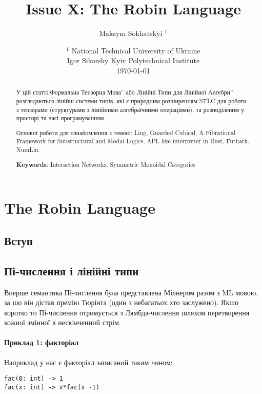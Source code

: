 \documentclass{article}
\begin{document}
\title{Issue X: The Robin Language}
\author{Maksym Sokhatskyi $^1$}
\date{ $^1$ National Technical University of Ukraine \\
       \small Igor Sikorsky Kyiv Polytechnical Institute \\
       \today }

\maketitle

\begin{abstract}

У цій статті Формальна Тензорна Мова'' або Лінійні Типи для Лінійної Алгебри''
розглядаються лінійні системи типів,
які є природним розширенням STLC для роботи з тензорами (структурами з лінійними алгебраїчними операціями),
та розподіленим у просторі та часі програмуванням.

Основні роботи для ознайомлення з темою: Ling, Guarded Cubical,
A Fibrational Framework for Substructural and Modal Logics,
APL-like interpreter in Rust, Futhark, NumLin.

{\bf Keywords}: Interaction Networks, Symmetric Monoidal Categories
\end{abstract}

\ifincludeTOC
  \tableofcontents
\fi

\newpage

\section{The Robin Language}

\subsection{Вступ}

\subsection{Пі-числення і лінійні типи}
Вперше семантика Пі-числення була представлена Мілнером разом з ML мовою,
за шо він дістав премію Тюрінга (один з небагатьох хто заслужено).
Якшо коротко то Пі-числення отримується з Лямбда-числення шляхом перетворення
кожної змінної в нескінченний стрім.

\paragraph{Приклад 1: факторіал}
Наприклад у нас є факторіал записаний таким чином:
\begin{lstlisting}
fac(0: int) -> 1
fac(x: int) -> x*fac(x -1)
\end{lstlisting}
\end{document}
